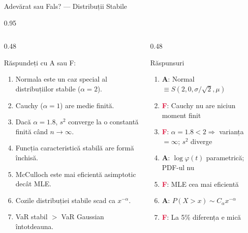 \documentclass[9pt, aspectratio=169, t]{beamer}
\begin{document}
\begin{frame}{Adevărat sau Fals? --- Distribuții Stabile}
\begin{cminipage}{0.95\textwidth}
\begin{columns}[T]
\begin{column}{0.48\textwidth}
    \begin{block}{Răspundeți cu A sau F:}
    \scriptsize
    \begin{enumerate}\setlength{\itemsep}{0pt}
        \item Normala este un caz special al distribuțiilor stabile ($\alpha = 2$).
        \item Cauchy ($\alpha = 1$) are medie finită.
        \item Dacă $\alpha = 1.8$, $s^2$ converge la o constantă finită când $n \to \infty$.
        \item Funcția caracteristică stabilă are formă închisă.
        \item McCulloch este mai eficientă asimptotic decât MLE.
        \item Cozile distribuției stabile scad ca $x^{-\alpha}$.
        \item VaR stabil $>$ VaR Gaussian întotdeauna.
    \end{enumerate}
    \end{block}
\end{column}
\begin{column}{0.48\textwidth}
    \begin{exampleblock}{Răspunsuri}
    \scriptsize
    \begin{enumerate}\setlength{\itemsep}{0pt}
        \item \textcolor{Forest}{\textbf{A}}: Normal $\equiv S(2, 0, \sigma/\sqrt{2}, \mu)$
        \item \textcolor{Crimson}{\textbf{F}}: Cauchy nu are niciun moment finit
        \item \textcolor{Crimson}{\textbf{F}}: $\alpha = 1.8 < 2 \Rightarrow$ varianța $= \infty$; $s^2$ diverge
        \item \textcolor{Forest}{\textbf{A}}: $\log\varphi(t)$ parametrică; PDF-ul nu
        \item \textcolor{Crimson}{\textbf{F}}: MLE cea mai eficientă
        \item \textcolor{Forest}{\textbf{A}}: $P(X > x) \sim C_\alpha x^{-\alpha}$
        \item \textcolor{Crimson}{\textbf{F}}: La 5\% diferența e mică
    \end{enumerate}
    \end{exampleblock}
\end{column}
\end{columns}
\end{cminipage}
\end{frame}
\end{document}
